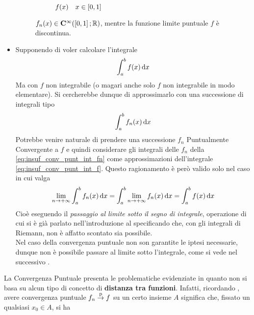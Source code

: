 \begin{itemize}
\begin{figure}[H]
\begin{subfigure}{.49\textwidth}
{
				}
				\caption{$f(x) \quad x \in \left[0,1\right]$}
			\end{subfigure}
			\caption{$f_n(x) \in \mathbf{C^{\infty}}(\left[0,1\right]; \mathbb{R})$, mentre la funzione limite puntuale $f$ è discontinua.}
			\label{fig:cont_fn_non_passa_a_f}
		\end{figure}
	\item
		Supponendo di voler calcolare l'integrale
		\begin{equation}
			\label{eq:insuf_conv_punt_int_f}
			\int_a^b f(x) \,\mathrm{d}{x}
		\end{equation}
		Ma con $f$ non integrabile (o magari anche solo $f$ non integrabile in modo elementare). Si cercherebbe dunque di approssimarlo con una successione di integrali tipo
		\begin{equation}
			\label{eq:insuf_conv_punt_int_fn}
			\int_a^b f_n(x) \,\mathrm{d}{x}
		\end{equation}
		Potrebbe venire naturale di prendere una successione $f_n$ Puntualmente Convergente a $f$ e quindi considerare gli integrali delle $f_n$ della \cref{eq:insuf_conv_punt_int_fn} come approssimazioni dell'integrale \cref{eq:insuf_conv_punt_int_f}. Questo ragionamento è però valido solo nel caso in cui valga
		\begin{equation}
			\label{eq:conv_punt_pass_lim_integrale}
			\lim\limits_{n \to +\infty} \int_a^b f_n(x) \,\mathrm{d}{x} = \int_a^b \lim\limits_{n \to +\infty} f_n(x) \,\mathrm{d}{x} = \int_a^b f(x) \,\mathrm{d}{x}
		\end{equation}
		Cioè eseguendo il \textit{passaggio al limite sotto il segno di integrale}, operazione di cui si è già parlato nell'introduzione al  specificando che, con gli integrali di Riemann, non è affatto scontato sia possibile.\\
		Nel caso della convergenza puntuale non son garantite le iptesi necessarie, dunque non è possibile passare al limite sotto l'integrale, come si vede nel successivo .
\end{itemize}
La Convergenza Puntuale presenta le problematiche evidenziate in quanto non si basa su alcun tipo di concetto di \textbf{distanza tra funzioni}. Infatti, ricordando , avere convergenza puntuale $f_n \overset{\text{p}}{\to} f$ su un certo insieme $A$ significa che, fissato un qualsiasi $x_0 \in A$, si ha
